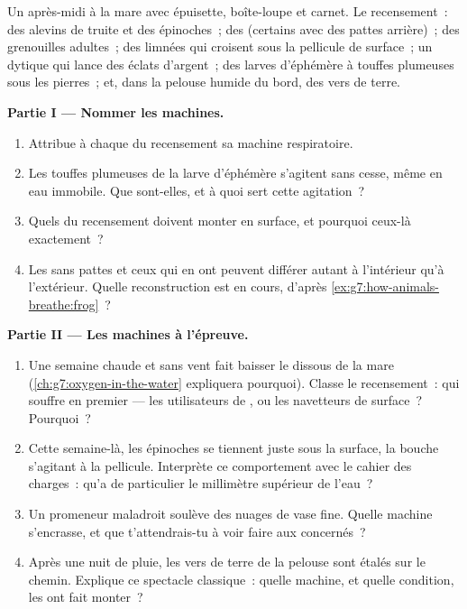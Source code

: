 \begin{problem}\label{pb:g7:how-animals-breathe:1}
Un après-midi à la mare avec épuisette, boîte-loupe et carnet. Le
recensement~: des alevins de truite et des épinoches~; des 
(certains avec des pattes arrière)~; des grenouilles adultes~; des
limnées qui croisent sous la pellicule de surface~; un dytique qui
lance des éclats d'argent~; des larves d'éphémère à touffes
plumeuses sous les pierres~; et, dans la pelouse humide du bord, des
vers de terre.

\medskip\noindent\textbf{Partie I --- Nommer les machines.}
\begin{enumerate}
  \item Attribue à chaque  du recensement sa machine
        respiratoire.
  \item Les touffes plumeuses de la larve d'éphémère s'agitent sans
        cesse, même en eau immobile. Que sont-elles, et à quoi sert
        cette agitation~?
  \item Quels  du recensement doivent monter en surface, et
        pourquoi ceux-là exactement~?
  \item Les  sans pattes et ceux qui en ont peuvent différer
        autant à l'intérieur qu'à l'extérieur. Quelle
        reconstruction est en cours, d'après
        \cref{ex:g7:how-animals-breathe:frog}~?
\end{enumerate}

\medskip\noindent\textbf{Partie II --- Les machines à
l'épreuve.}
\begin{enumerate}[resume]
  \item Une semaine chaude et sans vent fait baisser le 
        dissous de la mare (\cref{ch:g7:oxygen-in-the-water}
        expliquera pourquoi). Classe le recensement~: qui souffre
        en premier --- les utilisateurs de , ou les
        navetteurs de surface~? Pourquoi~?
  \item Cette semaine-là, les épinoches se tiennent juste sous la
        surface, la bouche s'agitant à la pellicule. Interprète ce
        comportement avec le cahier des charges~: qu'a de
        particulier le millimètre supérieur de l'eau~?
  \item Un promeneur maladroit soulève des nuages de vase fine.
        Quelle machine s'encrasse, et que t'attendrais-tu à voir
        faire aux  concernés~?
  \item Après une nuit de pluie, les vers de terre de la pelouse
        sont étalés sur le chemin. Explique ce spectacle
        classique~: quelle machine, et quelle condition, les ont
        fait monter~?
\end{enumerate}


\end{problem}
